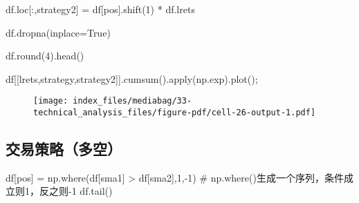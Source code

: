 \documentclass[
  letterpaper,
  DIV=11,
  numbers=noendperiod]{scrreprt}
\newenvironment{Shaded}{\begin{snugshade}}{\end{snugshade}}
\newcommand{\BuiltInTok}[1]{\textcolor[rgb]{0.00,0.23,0.31}{#1}}
\newcommand{\CommentTok}[1]{\textcolor[rgb]{0.37,0.37,0.37}{#1}}
\newcommand{\DecValTok}[1]{\textcolor[rgb]{0.68,0.00,0.00}{#1}}
\newcommand{\NormalTok}[1]{\textcolor[rgb]{0.00,0.23,0.31}{#1}}
\newcommand{\OperatorTok}[1]{\textcolor[rgb]{0.37,0.37,0.37}{#1}}
\newcommand{\StringTok}[1]{\textcolor[rgb]{0.13,0.47,0.30}{#1}}
\newcommand{\VariableTok}[1]{\textcolor[rgb]{0.07,0.07,0.07}{#1}}
\begin{document}
\begin{Shaded}
\begin{Highlighting}[]
\NormalTok{df.loc[:,}\StringTok{\textquotesingle{}strategy2\textquotesingle{}}\NormalTok{] }\OperatorTok{=}\NormalTok{ df[}\StringTok{\textquotesingle{}pos\textquotesingle{}}\NormalTok{].shift(}\DecValTok{1}\NormalTok{) }\OperatorTok{*}\NormalTok{ df.lrets}

\NormalTok{df.dropna(inplace}\OperatorTok{=}\VariableTok{True}\NormalTok{)}

\NormalTok{df.}\BuiltInTok{round}\NormalTok{(}\DecValTok{4}\NormalTok{).head()}

\NormalTok{df[[}\StringTok{\textquotesingle{}lrets\textquotesingle{}}\NormalTok{,}\StringTok{\textquotesingle{}strategy\textquotesingle{}}\NormalTok{,}\StringTok{\textquotesingle{}strategy2\textquotesingle{}\textquotesingle{}\textquotesingle{}}\NormalTok{]].cumsum().}\BuiltInTok{apply}\NormalTok{(np.exp).plot()}\OperatorTok{;}
\end{Highlighting}
\end{Shaded}

\begin{figure}[H]

{\centering \texttt{[image: index\_files/mediabag/33-technical\_analysis\_files/figure-pdf/cell-26-output-1.pdf]}

}

\end{figure}

\hypertarget{ux4ea4ux6613ux7b56ux7565ux591aux7a7a}{%
\subsection{交易策略（多空）}\label{ux4ea4ux6613ux7b56ux7565ux591aux7a7a}}

\begin{Shaded}
\begin{Highlighting}[]
\NormalTok{df[}\StringTok{\textquotesingle{}pos\textquotesingle{}}\NormalTok{] }\OperatorTok{=}\NormalTok{ np.where(df[}\StringTok{\textquotesingle{}sma1\textquotesingle{}}\NormalTok{] }\OperatorTok{\textgreater{}}\NormalTok{ df[}\StringTok{\textquotesingle{}sma2\textquotesingle{}}\NormalTok{],}\DecValTok{1}\NormalTok{,}\OperatorTok{{-}}\DecValTok{1}\NormalTok{) }\CommentTok{\# np.where()生成一个序列，条件成立则1，反之则{-}1}
\NormalTok{df.tail()}
\end{Highlighting}
\end{Shaded}
\end{document}
